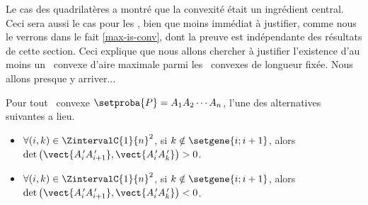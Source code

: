 Le cas des quadrilatères a montré que la convexité était un ingrédient central. Ceci sera aussi le cas pour les \ngones, bien que moins immédiat à justifier, comme nous le verrons dans le fait \ref{max-is-conv}, dont la preuve est indépendante des résultats de cette section.
%
Ceci explique que nous allons chercher à justifier l'existence d'au moins un \ngone\ convexe d'aire maximale parmi les \ngones\ convexes de longueur fixée. Nous allons presque y arriver...




\begin{fact} \label{conv-pos-det}
    Pour tout \ngone\ convexe $\setproba{P} = A_1 A_2 \cdots A_n$, l'une des alternatives suivantes a lieu.
	\begin{itemize}
		\item $\forall (i, k) \in \ZintervalC{1}{n}^2$,
		si $k \notin \setgene{i ; i+1}$, alors
		$\det \big( \vect{A^{\,\prime}_i A^{\,\prime}_{i+1}}, \vect{A^{\,\prime}_i A^{\,\prime}_k} \big) > 0$.

		\item $\forall (i, k) \in \ZintervalC{1}{n}^2$,
		si $k \notin \setgene{i ; i+1}$, alors
		$\det \big( \vect{A^{\,\prime}_i A^{\,\prime}_{i+1}}, \vect{A^{\,\prime}_i A^{\,\prime}_k} \big) < 0$.
    \end{itemize}
\end{fact}


